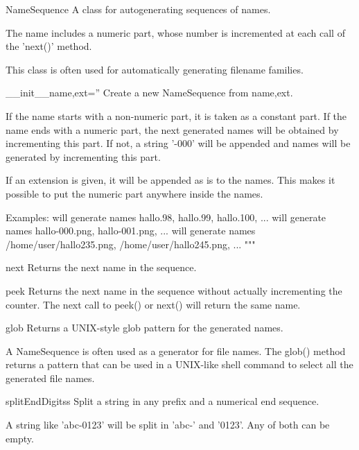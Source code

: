 \begin{classdesc}{NameSequence}{}
A class for autogenerating sequences of names.

The name includes a numeric part, whose number is incremented
at each call of the 'next()' method.

This class is often used for automatically generating filename families.
    
\begin{memberdesc}{__init__}{name,ext=''}
Create a new NameSequence from name,ext.

If the name starts with a non-numeric part, it is taken as a constant part.
If the name ends with a numeric part, the next generated names will
be obtained by incrementing this part.
If not, a string '-000' will be appended and names will be generated
by incrementing this part.

If an extension is given, it will be appended as is to the names.
This makes it possible to put the numeric part anywhere inside the
names.

Examples:
 will generate names hallo.98, hallo.99, hallo.100, ...
 will generate names hallo-000.png, hallo-001.png, ...
 will generate names
/home/user/hallo235.png, /home/user/hallo245.png, ...
"""
\end{memberdesc}

\begin{memberdesc}{next}
Returns the next name in the sequence.
\end{memberdesc}

\begin{memberdesc}{peek}
Returns the next name in the sequence without actually incrementing the counter.
The next call to peek() or next() will return the same name.
\end{memberdesc}

\begin{memberdesc}{glob}
Returns a UNIX-style glob pattern for the generated names.

A NameSequence is often used as a generator for file names.
The glob() method returns a pattern that can be used in a
UNIX-like shell command to select all the generated file names.
\end{memberdesc}
\end{classdesc}


\begin{funcdesc}{splitEndDigits}{s}
    Split a string in any prefix and a numerical end sequence.

    A string like 'abc-0123' will be split in 'abc-' and '0123'.
    Any of both can be empty.
\end{funcdesc} 




